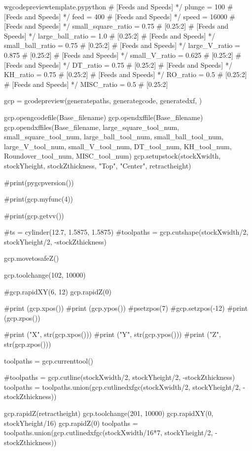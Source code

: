 \documentclass{ltxdoc}
\begin{document}
\begin{writecode}{w}{gcodepreviewtemplate.py}{python}
# [Feeds and Speeds] */
plunge = 100
# [Feeds and Speeds] */
feed = 400
# [Feeds and Speeds] */
speed = 16000
# [Feeds and Speeds] */
small_square_ratio = 0.75  # [0.25:2]
# [Feeds and Speeds] */
large_ball_ratio = 1.0  # [0.25:2]
# [Feeds and Speeds] */
small_ball_ratio = 0.75  # [0.25:2]
# [Feeds and Speeds] */
large_V_ratio = 0.875  # [0.25:2]
# [Feeds and Speeds] */
small_V_ratio = 0.625  # [0.25:2]
# [Feeds and Speeds] */
DT_ratio = 0.75  # [0.25:2]
# [Feeds and Speeds] */
KH_ratio = 0.75  # [0.25:2]
# [Feeds and Speeds] */
RO_ratio = 0.5  # [0.25:2]
# [Feeds and Speeds] */
MISC_ratio = 0.5  # [0.25:2]

gcp = gcodepreview(generatepaths, 
                   generategcode, 
                   generatedxf, 
                   )

gcp.opengcodefile(Base_filename)
gcp.opendxffile(Base_filename)
gcp.opendxffiles(Base_filename, 
                 large_square_tool_num, 
                 small_square_tool_num, 
                 large_ball_tool_num, 
                 small_ball_tool_num, 
                 large_V_tool_num, 
                 small_V_tool_num, 
                 DT_tool_num, 
                 KH_tool_num, 
                 Roundover_tool_num, 
                 MISC_tool_num)
gcp.setupstock(stockXwidth, stockYheight, stockZthickness, "Top", "Center", retractheight)

#print(pygcpversion())

#print(gcp.myfunc(4))

#print(gcp.getvv())

#ts = cylinder(12.7, 1.5875, 1.5875)
#toolpaths = gcp.cutshape(stockXwidth/2, stockYheight/2, -stockZthickness)

gcp.movetosafeZ()

gcp.toolchange(102, 10000)

#gcp.rapidXY(6, 12)
gcp.rapidZ(0)

#print (gcp.xpos())
#print (gcp.ypos())
#psetzpos(7)
#gcp.setzpos(-12)
#print (gcp.zpos())

#print ("X", str(gcp.xpos()))
#print ("Y", str(gcp.ypos()))
#print ("Z", str(gcp.zpos()))

toolpaths = gcp.currenttool()

#toolpaths = gcp.cutline(stockXwidth/2, stockYheight/2, -stockZthickness)
toolpaths = toolpaths.union(gcp.cutlinedxfgc(stockXwidth/2, stockYheight/2, -stockZthickness))

gcp.rapidZ(retractheight)
gcp.toolchange(201, 10000)
gcp.rapidXY(0, stockYheight/16)
gcp.rapidZ(0)
toolpaths = toolpaths.union(gcp.cutlinedxfgc(stockXwidth/16*7, stockYheight/2, -stockZthickness))


\end{writecode}
\end{document}
